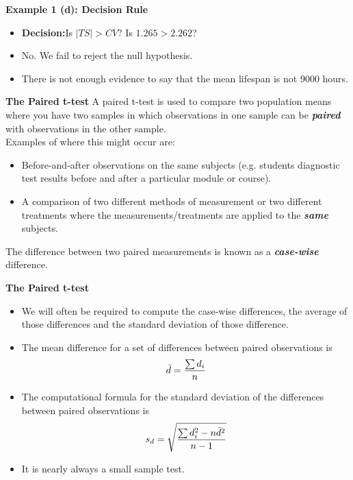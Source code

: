 \documentclass[a4]{beamer}
\begin{document}

\noindent \textbf{Example 1 (d): Decision Rule }
\large
\begin{itemize}
\item \textbf{Decision:}Is $|TS| >CV$? Is $1.265 > 2.262$?
\item No. We fail to reject the null hypothesis. \item There is not enough evidence to say that the mean lifespan is not 9000 hours.
\end{itemize}



{
\noindent \textbf{The Paired t-test}
A paired t-test is used to compare two population means where you have two samples in
which observations in one sample can be \textbf{\emph{paired}} with observations in the other sample.\\
\bigskip
Examples of where this might occur are:
\begin{itemize}
\item Before-and-after observations on the same subjects (e.g. students diagnostic test
results before and after a particular module or course).
\item A comparison of two different methods of measurement or two different treatments
where the measurements/treatments are applied to the \textbf{\emph{same}} subjects.
\end{itemize}
The difference between two paired measurements is known as a \textbf{\emph{case-wise}} difference.
}




\noindent \textbf{The Paired t-test}
\begin{itemize}
\item We will often be required to compute the case-wise differences, the average of those differences and the standard deviation of those difference.

\item The mean difference for a set of differences between paired observations is
\[ \bar{d} = {\sum d_i \over n }\]

\item The computational formula for the standard deviation of the differences
between paired observations is
\[s_d = \sqrt{ {\sum d_i^2 - n\bar{d}^2 \over n-1}}\]
\item It is nearly always a small sample test.
\end{itemize}
\end{document}
